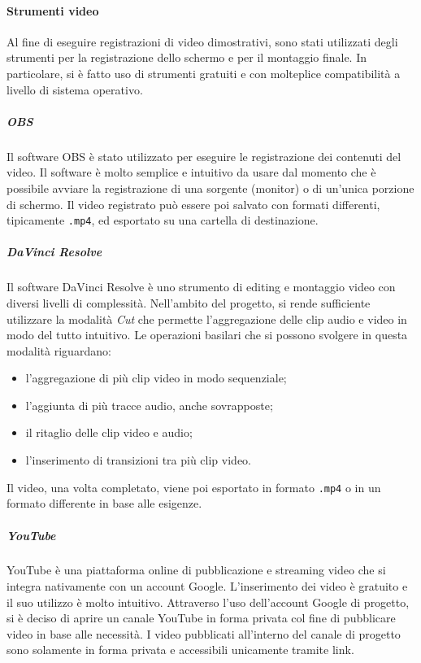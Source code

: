 	\paragraph{Strumenti video}

	Al fine di eseguire registrazioni di video dimostrativi, sono stati utilizzati degli strumenti per la registrazione dello schermo e per il montaggio finale. In particolare, si è fatto uso di strumenti gratuiti e con molteplice compatibilità a livello di sistema operativo.

		\subparagraph{OBS}

		Il software OBS è stato utilizzato per eseguire le registrazione dei contenuti del video. Il software è molto semplice e intuitivo da usare dal momento che è possibile avviare la registrazione di una sorgente (monitor) o di un'unica porzione di schermo. Il video registrato può essere poi salvato con formati differenti, tipicamente \verb!.mp4!, ed esportato su una cartella di destinazione. 

		\subparagraph{DaVinci Resolve}

		Il software DaVinci Resolve è uno strumento di editing e montaggio video con diversi livelli di complessità. Nell'ambito del progetto, si rende sufficiente utilizzare la modalità \textit{Cut} che permette l'aggregazione delle clip audio e video in modo del tutto intuitivo. Le operazioni basilari che si possono svolgere in questa modalità riguardano:
		\begin{itemize}
			\item l'aggregazione di più clip video in modo sequenziale;
			\item l'aggiunta di più tracce audio, anche sovrapposte;
			\item il ritaglio delle clip video e audio;
			\item l'inserimento di transizioni tra più clip video.
		\end{itemize}
		Il video, una volta completato, viene poi esportato in formato \verb!.mp4! o in un formato differente in base alle esigenze.

		\subparagraph{YouTube}

		YouTube è una piattaforma online di pubblicazione e streaming video che si integra nativamente con un account Google. L'inserimento dei video è gratuito e il suo utilizzo è molto intuitivo.
		Attraverso l'uso dell'account Google di progetto, si è deciso di aprire un canale YouTube in forma privata col fine di pubblicare video in base alle necessità. I video pubblicati all'interno del canale di progetto sono solamente in forma privata e accessibili unicamente tramite link.
  

